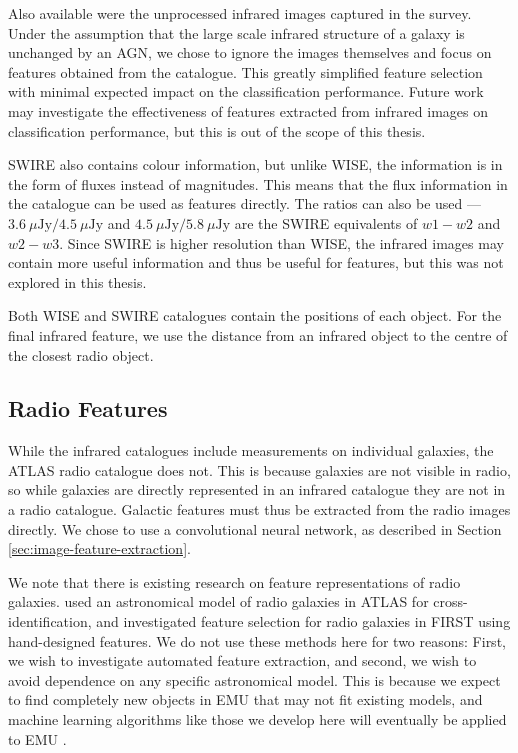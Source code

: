     Also available were the unprocessed infrared images captured in the survey.
    Under the assumption that the large scale infrared structure of a galaxy is
    unchanged by an AGN, we chose to ignore the images themselves and focus on
    features obtained from the catalogue. This greatly simplified feature
    selection with minimal expected impact on the classification performance.
    Future work may investigate the effectiveness of features extracted from
    infrared images on classification performance, but this is out of the scope
    of this thesis.

    SWIRE also contains colour information, but unlike WISE, the information is
    in the form of fluxes instead of magnitudes. This means that the flux
    information in the catalogue can be used as features directly. The ratios
    can also be used --- $3.6\ \mu\text{Jy} / 4.5\ \mu\text{Jy}$ and $4.5\
    \mu\text{Jy} / 5.8\ \mu\text{Jy}$ are the SWIRE equivalents of $w1 - w2$ and
    $w2 - w3$. Since SWIRE is higher resolution than WISE, the
    infrared images may contain more useful information and thus be useful for
    features, but this was not explored in this thesis.

    Both WISE and SWIRE catalogues contain the positions of each object. For the
    final infrared feature, we use the distance from an infrared object to the
    centre of the closest radio object.

  \subsection{Radio Features}
  \label{sec:radio-features}

    While the infrared catalogues include measurements on individual galaxies,
    the ATLAS radio catalogue does not. This is because galaxies are not
    visible in radio, so while galaxies are directly represented in an infrared
    catalogue they are not in a radio catalogue. Galactic features must thus be
    extracted from the radio images directly. We chose to use a convolutional
    neural network, as described in Section \ref{sec:image-feature-extraction}.

    We note that there is existing research on feature representations of radio
    galaxies. \citet{fan15} used an astronomical model of radio galaxies in
    ATLAS for cross-identification, and \citet{proctor06} investigated feature
    selection for radio galaxies in FIRST using hand-designed features. We do
    not use these methods here for two reasons: First, we wish to investigate
    automated feature extraction, and second, we wish to avoid dependence on any
    specific astronomical model. This is because we expect to find completely
    new objects in EMU that may not fit existing models, and machine learning
    algorithms like those we develop here will eventually be applied to EMU
    \citep{banfield15}.

